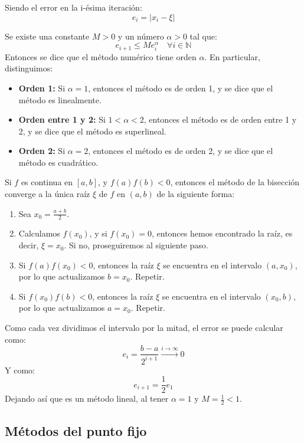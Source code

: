 Siendo el error en la i-ésima iteración:
\[
    e_i = |x_i - \xi|
\]

\begin{definición}
    Se existe una constante $M > 0$ y un número $\alpha > 0$ tal que:
    \[
        e_{i+1} \leq M e_i^\alpha \quad \forall i \in \mathbb{N}
    \]
    Entonces se dice que el método numérico tiene orden $\alpha$. En particular, distinguimos:
    \begin{itemize}
        \item \textbf{Orden 1: } Si $\alpha = 1$, entonces el método es de orden 1, y se dice que el método es linealmente.
        \item \textbf{Orden entre 1 y 2: } Si $1 < \alpha < 2$, entonces el método es de orden entre 1 y 2, y se dice que el método es superlineal.
        \item \textbf{Orden 2: } Si $\alpha = 2$, entonces el método es de orden 2, y se dice que el método es cuadrático.
    \end{itemize}
\end{definición}

\begin{teorema}
    Si $f$ es continua en $[a,b]$, y $f(a)f(b)<0$, entonces el método de la bisección converge a la única raíz $\xi$ de $f$ en $(a,b)$ de la siguiente forma:
    \begin{enumerate}
        \item Sea $x_0 = \frac{a+b}{2}$.
        \item Calculamos $f(x_0)$, y si $f(x_0) = 0$, entonces hemos encontrado la raíz, es decir, $\xi = x_0$. Si no, proseguiremos al siguiente paso.
        \item[3.1] Si $f(a)f(x_0) < 0$, entonces la raíz $\xi$ se encuentra en el intervalo $(a, x_0)$, por lo que actualizamos $b = x_0$. Repetir.
        \item[3.2] Si $f(x_0)f(b) < 0$, entonces la raíz $\xi$ se encuentra en el intervalo $(x_0, b)$, por lo que actualizamos $a = x_0$. Repetir.
    \end{enumerate}
    Como cada vez dividimos el intervalo por la mitad, el error se puede calcular como:
    \[
        e_i = \frac{b-a}{2^{i+1}} \xrightarrow{i \to \infty} 0
    \]
    Y como:
    \[
        e_{i+1} = \frac{1}{2} e_1
    \]
    Dejando así que es un método lineal, al tener $\alpha = 1$ y $M=\frac{1}{2} < 1$.
\end{teorema}

\subsection{Métodos del punto fijo}

